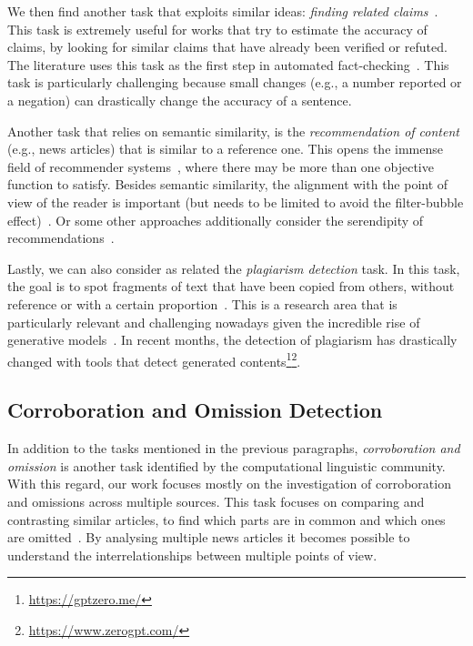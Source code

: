 We then find another task that exploits similar ideas: \emph{finding related claims}~\citep{almeida2020text}.
This task is extremely useful for works that try to estimate the accuracy of claims, by looking for similar claims that have already been verified or refuted.
The literature uses this task as the first step in automated fact-checking~\citep{nakov2021automated,guo2022survey}.
This task is particularly challenging because small changes (e.g., a number reported or a negation) can drastically change the accuracy of a sentence.


Another task that relies on semantic similarity, is the \emph{recommendation of content} (e.g., news articles) that is similar to a reference one.
This opens the immense field of recommender systems~\citep{tintarev2006similarity,karimi2018news,feng2020news}, where there may be more than one objective function to satisfy.
Besides semantic similarity, the alignment with the point of view of the reader is important (but needs to be limited to avoid the filter-bubble effect)~\citep{lunardi2020metric,nguyen2014exploring,lunardi2019representing}.
Or some other approaches additionally consider the serendipity of recommendations~\citep{ziarani2021serendipity,abdollahpouri2021toward,raza2022news}.

Lastly, we can also consider as related the \emph{plagiarism detection} task.
In this task, the goal is to spot fragments of text that have been copied from others, without reference or with a certain proportion~\citep{stein2006near,alzahrani2010fuzzy,arabi2022improving}.
This is a research area that is particularly relevant and challenging nowadays given the incredible rise of generative models~\cite{openai2023gpt4}. In recent months, the detection of plagiarism has drastically changed with tools that detect generated contents\footnote{\url{https://gptzero.me/}}\footnote{\url{https://www.zerogpt.com/}}.


\subsection{\statusgreen Corroboration and Omission Detection}
\label{ssec:lit_relationships_corr_omiss}

In addition to the tasks mentioned in the previous paragraphs,
\textit{corroboration and omission}
is another task identified by the computational linguistic community.
With this regard, our work focuses mostly on the investigation of corroboration and omissions
across multiple sources.
This task focuses on comparing and contrasting similar articles, to find which parts are in common and which ones are omitted~\cite{ehrhardt2021omission,bountouridis2018explaining,ko2023claimdiff}.
By analysing multiple news articles it becomes possible to understand the interrelationships between multiple points of view.

